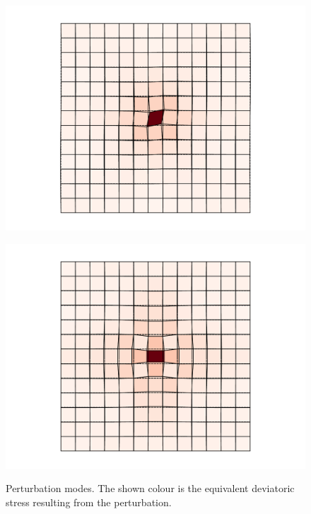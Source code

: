 \documentclass[fleqn]{goose-article}
\begin{document}
\begin{figure}[htp]
    \centering
    \captionsetup[subfigure]{justification=centering}
    \begin{minipage}[t]{.49\textwidth}
        \centering
        \includegraphics[width=\textwidth]{perturbation_simple-shear.pdf}
        \label{fig:perturbation:simple-shear}
    \end{minipage}
    \hfill
    \begin{minipage}[t]{.49\textwidth}
        \centering
        \includegraphics[width=\textwidth]{perturbation_pure-shear.pdf}
        \label{fig:perturbation:pure-shear}
    \end{minipage}
    \caption{
        Perturbation modes.
        The shown colour is the equivalent deviatoric stress resulting from the perturbation.
    }
    \label{fig:perturbation}
\end{figure}
\end{document}
